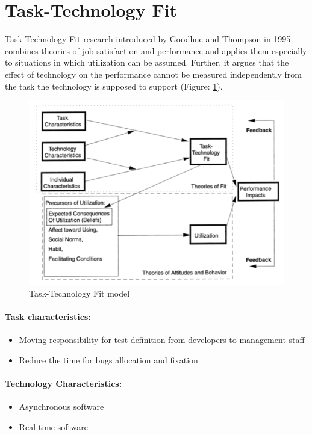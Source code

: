 \section{Task-Technology Fit}
Task Technology Fit research introduced by Goodhue and Thompson in 1995 \cite{MES10} combines theories of job satisfaction and performance and applies them especially to situations in which utilization can be assumed. Further, it argues that the effect of technology on the performance cannot be measured independently from the task the technology is supposed to support (Figure: \ref{fig:ttf}).
\begin{figure}[ht]
	\label{fig:ttf}
	\centering
	\includegraphics[width=\textwidth]{grafiken/ttf.png}
	\caption{Task-Technology Fit model\cite{MES10}}
\end{figure}

\paragraph{Task characteristics:}
\begin{itemize}
	\item Moving responsibility for test definition from developers to management staff
	\item Reduce the time for bugs allocation and fixation
\end{itemize}


\paragraph{Technology Characteristics:}
\begin{itemize}
	\item Asynchronous software
	\item Real-time software
\end{itemize}

